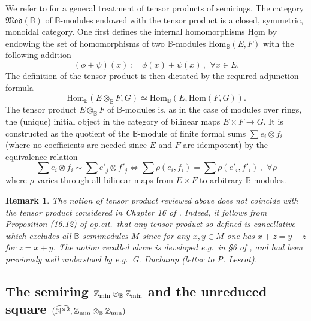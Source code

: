 \documentclass[noams,lp]{compositio}
\newtheorem{rem}[thm]{Remark}
\def\Hom{{\rm Hom}}
\def\B{{\mathbb B}}
\def\N{{\mathbb N}}
\def\Z{{\mathbb Z}}
\def\qqq{\,,\,~\forall}
\newcommand{\eg}{{\it e.g.\/}\ }
\newcommand{\opcit}{{\it op.cit.\/}\ }
\def\zmin{\Z_{\rm min}}
\def\Hom {{\mbox{Hom}}}
\def\catmo{{\mathfrak{Mod}}}
\def\nbo{{\zmin\otimes_\B \zmin}}
\def\wntb{{\widehat{\N^{\times 2}}}}
\def\arithb{{(\wntb,\nbo)}}
\begin{document}
We refer to \cite{PR} for a general treatment of tensor products of semirings. The category $\catmo(\B)$ of $\B$-modules endowed with the tensor product  is a closed, symmetric, monoidal category.  One first defines the internal homomorphisms  
$\underline\Hom$ by endowing the set of homomorphisms of two $\B$-modules $\Hom_\B(E,F)$ with the following addition
$$
(\phi+\psi)(x):=\phi(x)+\psi(x)\qqq x\in E.
$$
The definition of the tensor product is then dictated by the required adjunction formula
$$
\Hom_\B(E\otimes_\B F,G)\simeq \Hom_\B(E,\underline\Hom(F,G)).
$$
The tensor product $E\otimes_\B F$ of $\B$-modules is, as in the case of modules over rings,  the (unique) initial object in the category of bilinear maps $E\times F\to G$. It is constructed as  the quotient  of the $\B$-module of finite formal sums $\sum e_i\otimes f_i$ (where no coefficients are needed since $E$ and $F$ are idempotent) by the equivalence relation 
$$
\sum e_i\otimes f_i\sim \sum e'_j\otimes f'_j\iff \sum \rho(e_i,f_i)=\sum \rho(e'_i,f'_i)\qqq \rho
$$
where $\rho$ varies through all bilinear maps from $E\times F$ to arbitrary $\B$-modules. 
\begin{rem}  {\rm The notion of tensor product reviewed above does not coincide with the tensor product considered in Chapter 16 of \cite{Golan}. Indeed, it follows from Proposition (16.12) of \opcit that any tensor product so defined is cancellative which excludes all $\B$-semimodules $M$ since for any $x,y\in M$ one has $x+z=y+z$ for $z=x+y$. The notion recalled above is developed \eg  in \S 6 of \cite{PR}, and had been previously well understood by \eg G. Duchamp (letter to P. Lescot).
}\end{rem}


\subsection{The semiring $\nbo$ and the unreduced square $\arithb$}
\end{document}
